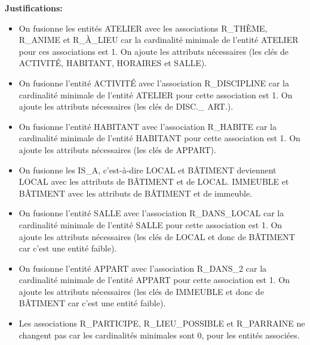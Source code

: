 \documentclass[a4paper,10.5pt]{report}
\begin{document}
	\textbf{Justifications: }
	\begin{itemize}
		\item On fusionne les entités ATELIER avec les associations R\_THÈME, R\_ANIME et R\_À\_LIEU car la cardinalité minimale de l'entité ATELIER pour ces associations est 1. On ajoute les attributs nécessaires (les clés de ACTIVITÉ, HABITANT, HORAIRES et SALLE).
		\item On fusionne l'entité ACTIVITÉ avec l'association R\_DISCIPLINE car la cardinalité minimale de l'entité ATELIER pour cette association est 1. On ajoute les attributs nécessaires (les clés de DISC.\_ ART.).
		\item On fusionne l'entité HABITANT avec l'association R\_HABITE car la cardinalité minimale de l'entité HABITANT pour cette association est 1. On ajoute les attributs nécessaires (les clés de APPART).
		\item On fusionne les IS\_A, c'est-à-dire LOCAL et BÂTIMENT deviennent LOCAL avec les attributs de BÂTIMENT et de LOCAL\@. IMMEUBLE et BÂTIMENT avec les attributs de BÂTIMENT et de immeuble.	

		\item On fusionne l'entité SALLE avec l'association R\_DANS\_LOCAL car la cardinalité minimale de l'entité SALLE pour cette association est 1. On ajoute les attributs nécessaires (les clés de LOCAL et donc de BÂTIMENT car c'est une entité faible). 
		\item On fusionne l'entité APPART avec l'association R\_DANS\_2 car la cardinalité minimale de l'entité APPART pour cette association est 1. On ajoute les attributs nécessaires (les clés de IMMEUBLE et donc de BÂTIMENT car c'est une entité faible).
		\item Les associations R\_PARTICIPE, R\_LIEU\_POSSIBLE et R\_PARRAINE ne changent pas car les cardinalités minimales sont 0, pour les entités associées.

	\end{itemize}
	
	\newpage
\end{document}
